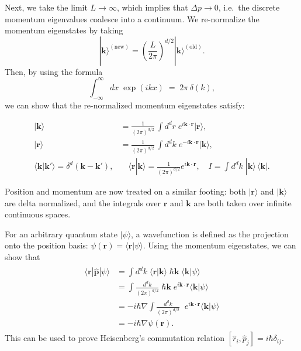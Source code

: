 \documentclass[pra,12pt]{revtex4}
\begin{document}
Next, we take the limit $L \rightarrow \infty$, which implies that
$\Delta p \rightarrow 0$, i.e.~the discrete momentum eigenvalues
coalesce into a continuum.  We re-normalize the momentum eigenstates
by taking
\begin{equation}
  |\mathbf{k}\rangle^{(\textrm{new})} = \left(\frac{L}{2\pi}\right)^{d/2} |\mathbf{k}\rangle^{(\textrm{old})}.
\end{equation}
Then, by using the formula
\begin{equation}
  \int_{-\infty}^\infty dx\; \exp(ikx) \;=\; 2\pi\, \delta(k),
\end{equation}
we can show that the re-normalized momentum eigenstates satisfy:
\begin{framed}
  \begin{align}
      |\mathbf{k}\rangle &= \frac{1}{(2\pi)^{d/2}} \, \int d^dr \; e^{i\mathbf{k}\cdot\mathbf{r}} |\mathbf{r}\rangle, \\
      |\mathbf{r}\rangle &= \frac{1}{(2\pi)^{d/2}} \, \int d^dk \; e^{-i\mathbf{k}\cdot\mathbf{r}} |\mathbf{k}\rangle, \\
      \langle\mathbf{k}|\mathbf{k}'\rangle = \delta^d(\mathbf{k}-\mathbf{k}'),& \quad \langle\mathbf{r}|\mathbf{k}\rangle = \frac{1}{(2\pi)^{d/2}} e^{i\mathbf{k}\cdot\mathbf{r}}, \quad I = \int d^dk \;|\mathbf{k}\rangle\,\langle\mathbf{k}|.
  \end{align}
\end{framed}
\vskip -0.15in
\noindent
Position and momentum are now treated on a similar footing: both
$|\mathbf{r}\rangle$ and $|\mathbf{k}\rangle$ are delta normalized,
and the integrals over $\mathbf{r}$ and $\mathbf{k}$ are both taken
over infinite continuous spaces.

For an arbitrary quantum state $|\psi\rangle$, a wavefunction is
defined as the projection onto the position basis: $\psi(\mathbf{r}) =
\langle \mathbf{r}|\psi\rangle$.  Using the momentum eigenstates, we can
show that
\begin{align}
  \begin{aligned}\langle \mathbf{r}|\hat{\mathbf{p}}|\psi\rangle &=  \int d^dk \; \langle\mathbf{r}|\mathbf{k}\rangle \; \hbar\mathbf{k} \; \langle\mathbf{k}|\psi\rangle \\ &=  \int \frac{d^dk}{(2\pi)^{d/2}}\; \hbar\mathbf{k} \;e^{i\mathbf{k}\cdot\mathbf{r}} \langle\mathbf{k}|\psi\rangle \\ &=  -i\hbar\nabla \int \frac{d^dk}{(2\pi)^{d/2}}\; \;e^{i\mathbf{k}\cdot\mathbf{r}} \langle\mathbf{k}|\psi\rangle \\ &= -i\hbar \nabla\psi(\mathbf{r}).\end{aligned}
\end{align}
This can be used to prove Heisenberg's commutation relation
$[\hat{r}_i, \hat{p}_j] = i\hbar\delta_{ij}$.
\end{document}
